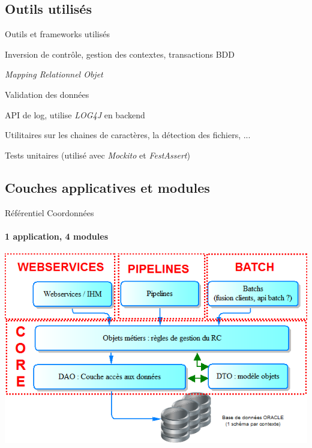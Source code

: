 \documentclass[compact]{beamer}%
\begin{document}
\subsection{Outils utilisés}

\begin{frame}{Outils et frameworks utilisés}

	\begin{description}[<+->]
	\item[Spring] Inversion de contrôle, gestion des contextes, transactions BDD
	\item[Hibernate] \emph{Mapping Relationnel Objet}
	\item[Hibernate Validator] Validation des données
	\item[SLF4J] API de log, utilise \emph{LOG4J} en backend
	\item[Commons Apache] Utilitaires sur les chaines de caractères, la détection des fichiers, ...
	\item[JUNIT] Tests unitaires (utilisé avec \emph{Mockito} et \emph{FestAssert})
	\end{description}
	
\end{frame}

\subsection{Couches applicatives et modules}

\begin{frame}{Référentiel Coordonnées}
	\framesubtitle{1 application, 4 modules}

	\includegraphics[width=\textwidth]{images/rc_arch_general.png}
\end{frame}
\end{document}
